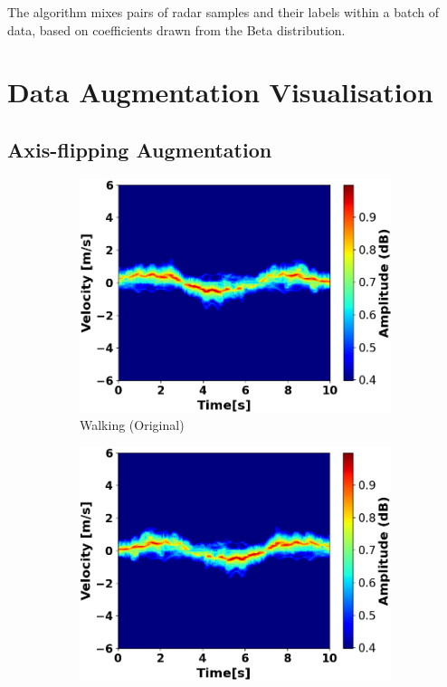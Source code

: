 \documentclass{l4proj}
\begin{document}
\begin{appendices}
\begin{algorithm}[h]
\caption{The algorithm mixes pairs of radar samples and their labels within a batch of data, based on coefficients drawn from the Beta distribution.}
\label{alg:mixup_data_augmentation}
\end{algorithm}

\newpage

\section{Data Augmentation Visualisation}
\subsection{Axis-flipping Augmentation}
\begin{figure}[h]
   \centering
   \begin{subfigure}[b]{0.35\textwidth}
        \includegraphics[width=\textwidth]{images/Velocity-Time_1_normalized_resized.png}
        \caption{Walking (Original)}
        \label{fig:velocity-Time_1_normalized_resized}
    \end{subfigure}
    \qquad
    \begin{subfigure}[b]{0.35\textwidth}
        \includegraphics[width=\textwidth]{images/Velocity-Time_1_normalized_resized-horizontal-flip.png}

\end{subfigure}
\end{figure}
\end{appendices}
\end{document}
